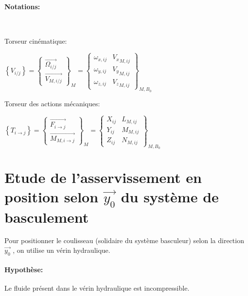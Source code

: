 \paragraph{Notations:} ~\ \\
\begin{minipage}[t]{0.45\linewidth}
Torseur cinématique:

$\left \{V_{i/ j}\right \}=\left\{
\begin{matrix}
 \overrightarrow {\Omega _{i/ j}} \\ 
 \overrightarrow {V_{M,i/j}} 
\end{matrix}
\right\}_{M}=\left\{
\begin{matrix}
 \omega_{x,ij} & {V_x }_{M,ij} \\
 \omega_{y,ij} & {V_y }_{M,ij} \\
 \omega_{z,ij} & {V_z}_{M,ij} 
\end{matrix}
\right\}_{M,B_0}$
\end{minipage}\hfill
\begin{minipage}[t]{0.45\linewidth}
Torseur des actions mécaniques:

$\left \{T_{i\rightarrow j}\right \}=\left\{
\begin{matrix}
 \overrightarrow {F_{i\rightarrow j}} \\ 
 \overrightarrow {M_{M,i\rightarrow j}} 
\end{matrix}
\right\}_{M}=\left \{
\begin{matrix}
 X_{ij} & {L }_{M,ij} \\
 Y_{ij} & {M }_{M,ij} \\
 Z_{ij} & {N }_{M,ij} 
\end{matrix}
\right \}_{M,B_0}$
\end{minipage}

\section{Etude de l'asservissement en position selon $\vec{y_0}$ du système de basculement}

Pour positionner le coulisseau (solidaire du système basculeur) selon la direction $\overrightarrow{y_0}$ , on utilise un vérin hydraulique.


\paragraph{Hypothèse:} Le fluide présent dans le vérin hydraulique est incompressible.

